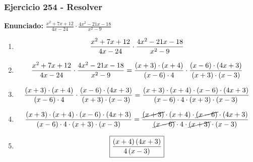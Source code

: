 \documentclass[11pt,a4paper]{article}
\newcommand{\fitmath}[1]{%
\[
\setbox0=\hbox{$\displaystyle #1$}%
\ifdim\wd0>\linewidth
\resizebox{\linewidth}{!}{$\displaystyle #1$}%
\else
#1%
\fi
\]
}
\begin{document}
\subsubsection*{Ejercicio 254 - Resolver}
\textbf{Enunciado:} $ \frac{x^{2} + 7 x + 12}{4 x - 24} \cdot \frac{4 x^{2} - 21 x - 18}{x^{2} - 9} $\par
\begin{enumerate}[leftmargin=2em]
\item \fitmath{\frac{x^{2} + 7 x + 12}{4 x - 24} \cdot \frac{4 x^{2} - 21 x - 18}{x^{2} - 9}}
\item \fitmath{\frac{x^{2} + 7 x + 12}{4 x - 24} \cdot \frac{4 x^{2} - 21 x - 18}{x^{2} - 9}= \frac{\left(x + 3\right)\cdot \left(x + 4\right)}{\left(x - 6\right)\cdot 4} \cdot \frac{\left(x - 6\right)\cdot \left(4 x + 3\right)}{\left(x + 3\right)\cdot \left(x - 3\right)}}
\item \fitmath{\frac{\left(x + 3\right)\cdot \left(x + 4\right)}{\left(x - 6\right)\cdot 4}\cdot \frac{\left(x - 6\right)\cdot \left(4 x + 3\right)}{\left(x + 3\right)\cdot \left(x - 3\right)}= \frac{\left(x + 3\right)\cdot \left(x + 4\right)\cdot \left(x - 6\right)\cdot \left(4 x + 3\right)}{\left(x - 6\right)\cdot 4\cdot \left(x + 3\right)\cdot \left(x - 3\right)}}
\item \fitmath{\frac{\left(x + 3\right)\cdot \left(x + 4\right)\cdot \left(x - 6\right)\cdot \left(4 x + 3\right)}{\left(x - 6\right)\cdot 4\cdot \left(x + 3\right)\cdot \left(x - 3\right)}= \frac{\cancel{\left(x + 3\right)}\cdot \left(x + 4\right)\cdot \cancel{\left(x - 6\right)}\cdot \left(4 x + 3\right)}{\cancel{\left(x - 6\right)}\cdot 4\cdot \cancel{\left(x + 3\right)}\cdot \left(x - 3\right)}}
\item \fitmath{\boxed{\frac{\left(x + 4\right) \left(4 x + 3\right)}{4 \left(x - 3\right)}}}
\end{enumerate}

\vspace{0.12cm}
\end{document}
